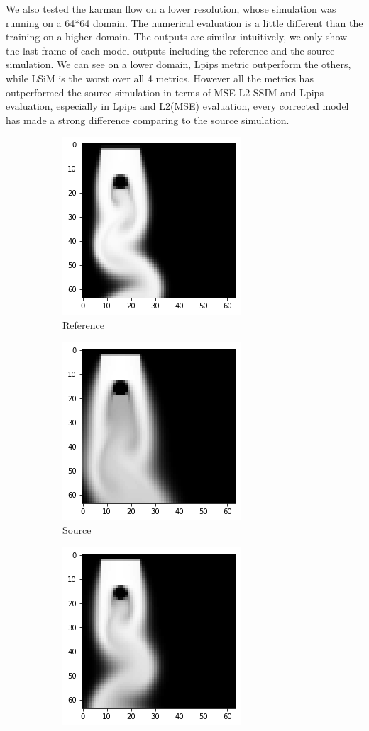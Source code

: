 \documentclass[a4paper,12pt,twoside]{report}
\begin{document}
We also tested the karman flow on a lower resolution, whose simulation was running on a 64*64 domain.
The numerical evaluation is a little different than the training on a higher domain. The outputs are similar intuitively, we only show the last frame of each model outputs including the reference and the source simulation.
We can see on a lower domain, Lpips metric outperform the others, while LSiM is the worst over all 4 metrics. However all the metrics has outperformed the source simulation in terms of MSE L2 SSIM and Lpips evaluation, especially in Lpips and L2(MSE) evaluation, every corrected model has made a strong difference comparing to the source simulation.  
\begin{figure}
	\centering
	\begin{subfigure}{0.32\textwidth}
		\centering
		\includegraphics[scale=0.5]{karman_low/ref}
		\caption{Reference}
	\end{subfigure}
	\begin{subfigure}{0.32\textwidth}
		\centering
		\includegraphics[scale=0.5]{karman_low/source}
		\caption{Source}
	\end{subfigure}
	\begin{subfigure}{0.32\textwidth}
		\centering
		\includegraphics[scale=0.5]{karman_low/mse}

\end{subfigure}
\end{figure}
\end{document}
